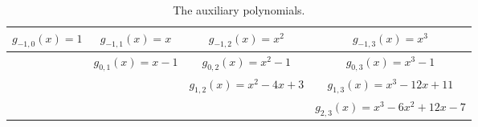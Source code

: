 \documentclass[preprint,12pt]{elsarticle}
\begin{document}


\begin{table}[ht] \label{tbl1}
\centering
\caption{The auxiliary polynomials.}
\label{tbl1}
\begin{tabular}{c c c c}
\toprule
\(g_{-1,0}(x)=1\) & \(g_{-1,1}(x)=x\) & \(g_{-1,2}(x)=x^2\) & \(g_{-1,3}(x)=x^3\) \\
\midrule
 & \(g_{0,1}(x)=x-1\) & \(g_{0,2}(x)=x^2-1\) & \(g_{0,3}(x)=x^3-1\) \\
 &  & \(g_{1,2}(x)=x^2-4x+3\) & \(g_{1,3}(x)=x^3-12x+11\) \\
 &  &  & \(g_{2,3}(x)=x^3-6x^2+12x-7\) \\
\bottomrule
\end{tabular}
\end{table}
\end{document}
